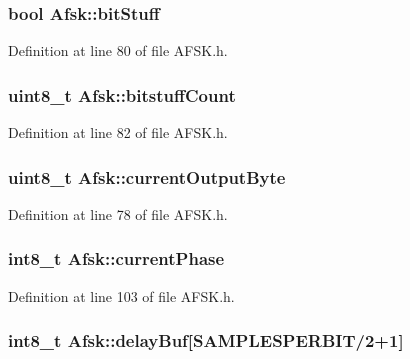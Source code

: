 \subsubsection[{\texorpdfstring{bit\+Stuff}{bitStuff}}]{\setlength{\rightskip}{0pt plus 5cm}bool Afsk\+::bit\+Stuff}\hypertarget{struct_afsk_aece27671c62a8c93ce32e4bd6c38f312}{}\label{struct_afsk_aece27671c62a8c93ce32e4bd6c38f312}


Definition at line 80 of file A\+F\+S\+K.\+h.

\subsubsection[{\texorpdfstring{bitstuff\+Count}{bitstuffCount}}]{\setlength{\rightskip}{0pt plus 5cm}uint8\+\_\+t Afsk\+::bitstuff\+Count}\hypertarget{struct_afsk_ab6ea81ad33d9cf98080a6e567cfd7887}{}\label{struct_afsk_ab6ea81ad33d9cf98080a6e567cfd7887}


Definition at line 82 of file A\+F\+S\+K.\+h.

\subsubsection[{\texorpdfstring{current\+Output\+Byte}{currentOutputByte}}]{\setlength{\rightskip}{0pt plus 5cm}uint8\+\_\+t Afsk\+::current\+Output\+Byte}\hypertarget{struct_afsk_abcc27bcdd8198ea3e46df974f7a17664}{}\label{struct_afsk_abcc27bcdd8198ea3e46df974f7a17664}


Definition at line 78 of file A\+F\+S\+K.\+h.

\subsubsection[{\texorpdfstring{current\+Phase}{currentPhase}}]{\setlength{\rightskip}{0pt plus 5cm}int8\+\_\+t Afsk\+::current\+Phase}\hypertarget{struct_afsk_a109e9e878c62839db0f611c8c636ba93}{}\label{struct_afsk_a109e9e878c62839db0f611c8c636ba93}


Definition at line 103 of file A\+F\+S\+K.\+h.

\subsubsection[{\texorpdfstring{delay\+Buf}{delayBuf}}]{\setlength{\rightskip}{0pt plus 5cm}int8\+\_\+t Afsk\+::delay\+Buf\mbox{[}{\bf S\+A\+M\+P\+L\+E\+S\+P\+E\+R\+B\+IT}/2+1\mbox{]}}\hypertarget{struct_afsk_aab24e087341259c5e3f9008a8557644e}{}\label{struct_afsk_aab24e087341259c5e3f9008a8557644e}


